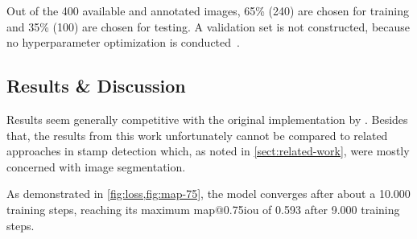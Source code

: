 
Out of the 400 available and annotated images, 65\% (240) are chosen for training
and 35\% (100) are chosen for testing. A validation set is not constructed, because
no hyperparameter optimization is conducted~\cite[cf.][120\psq]{Goodfellow.2016}.

\subsection{Results \& Discussion}\label{sect:results-and-discussion}
Results seem generally competitive with the original implementation by \textcite{Liu.2016}\footnotemark.
Besides that, the results from this work unfortunately cannot be compared to
related approaches in stamp detection which, as noted in \cref{sect:related-work},
were mostly concerned with image segmentation.

As demonstrated in \cref{fig:loss,fig:map-75}, the model converges after about
a 10.000 training steps, reaching its maximum \gls{map}@0.75\gls{iou} of 0.593
after 9.000 training steps.


